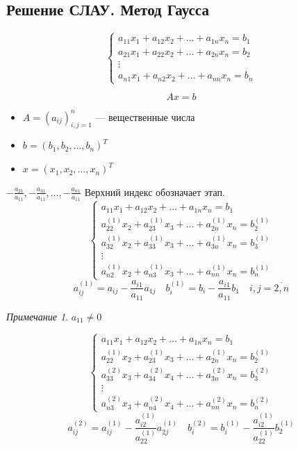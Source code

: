 \documentclass[oneside]{book}
\theoremstyle{plain}
\theoremstyle{remark}
\newtheorem*{remark}{Примечание}
\theoremstyle{definition}
\begin{document}
\subsection{Решение СЛАУ. Метод Гаусса}
\label{sec:org6e98aba}
\[ \begin{cases}
a_{11}x_1 + a_{12} x_2 + \dots + a_{1n}x_n = b_1 \\
a_{21}x_1 + a_{22} x_2 + \dots + a_{2n}x_n = b_2 \\
\vdots \\
a_{n1}x_1 + a_{n2} x_2 + \dots + a_{nn}x_n = b_n
\end{cases} \]

\[ Ax = b \]
\begin{itemize}
\item \(A = (a_{ij})_{i,j = 1}^n\) --- вещественные числа
\item \(b = (b_1, b_2, \dots, b_n)^T\)
\item \(x = (x_1, x_2, \dots, x_n)^T\)
\end{itemize}
\(-\frac{a_{21}}{a_{11}}, -\frac{a_{31}}{a_{11}}, \dots, -\frac{a_{n1}}{a_{11}}\)
Верхний индекс обозначает этап.
\[ \begin{cases}
a_{11}x_1 + a_{12} x_2 + \dots + a_{1n}x_n = b_1 \\
a_{22}^{(1)}x_2 + a_{23}^{(1)}x_3 + \dots + a_{2n}^{(1)}x_n = b_2^{(1)} \\
a_{32}^{(1)}x_2 + a_{33}^{(1)}x_3 + \dots + a_{3n}^{(1)}x_n = b_3^{(1)} \\
\vdots \\
a_{n2}^{(1)}x_2 + a_{n3}^{(1)}x_3 + \dots + a_{nn}^{(1)}x_n = b_n^{(1)}
\end{cases} \]
\[ a_{ij}^{(1)} = a_{ij} - \frac{a_{i1}}{a_{11}}a_{1j} \quad b_i^{(1)} = b_i - \frac{a_{i1}}{a_{11}}b_1 \quad i,j = \overline{2, n}\]
\begin{remark}
\(a_{11} \neq 0\)
\end{remark}

\[ \begin{cases}
a_{11}x_1 + a_{12} x_2 + \dots + a_{1n}x_n = b_1 \\
a_{22}^{(1)}x_2 + a_{23}^{(1)}x_3 + \dots + a_{2n}^{(1)}x_n = b_2^{(1)} \\
a_{33}^{(2)}x_3 + a_{34}^{(2)}x_4 + \dots + a_{3n}^{(2)}x_n = b_3^{(2)} \\
\vdots \\
a_{n3}^{(2)}x_3 + a_{n4}^{(2)}x_4 + \dots + a_{nn}^{(2)}x_n = b_n^{(2)}
\end{cases} \]
\[ a_{ij}^{(2)} = a_{ij}^{(1)} - \frac{a_{i2}^{(1)}}{a_{22}^{(1)}}a_{2j}^{(1)} \quad b_i^{(2)} = b_i^{(1)} - \frac{a_{i2}^{(1)}}{a_{22}^{(1)}}b_2^{(1)} \]
\end{document}
